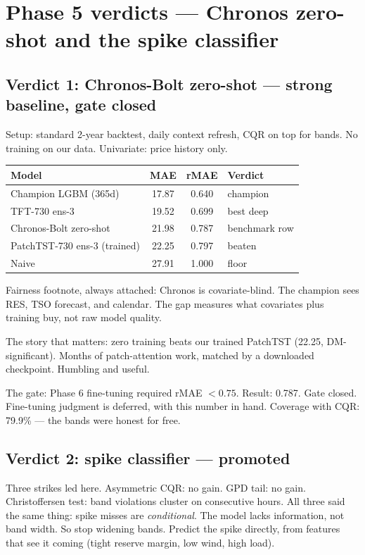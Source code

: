 \section{Phase 5 verdicts --- Chronos zero-shot and the spike classifier}

\subsection{Verdict 1: Chronos-Bolt zero-shot --- strong baseline, gate closed}

Setup: standard 2-year backtest, daily context refresh, CQR on top
for bands. No training on our data. Univariate: price history only.

\begin{tabular}{lccl}
\hline
Model & MAE & rMAE & Verdict \\
\hline
Champion LGBM (365d) & 17.87 & 0.640 & champion \\
TFT-730 ens-3 & 19.52 & 0.699 & best deep \\
Chronos-Bolt zero-shot & 21.98 & 0.787 & benchmark row \\
PatchTST-730 ens-3 (trained) & 22.25 & 0.797 & beaten \\
Naive & 27.91 & 1.000 & floor \\
\hline
\end{tabular}

\vspace{0.5em}
Fairness footnote, always attached: Chronos is covariate-blind.
The champion sees RES, TSO forecast, and calendar. The gap measures
what covariates plus training buy, not raw model quality.

The story that matters: zero training beats our trained PatchTST
(22.25, DM-significant). Months of patch-attention work, matched by
a downloaded checkpoint. Humbling and useful.

The gate: Phase 6 fine-tuning required rMAE $< 0.75$. Result: 0.787.
Gate closed. Fine-tuning judgment is deferred, with this number in
hand. Coverage with CQR: 79.9\% --- the bands were honest for free.

\subsection{Verdict 2: spike classifier --- promoted}

Three strikes led here. Asymmetric CQR: no gain. GPD tail: no gain.
Christoffersen test: band violations cluster on consecutive hours.
All three said the same thing: spike misses are \emph{conditional}.
The model lacks information, not band width. So stop widening bands.
Predict the spike directly, from features that see it coming
(tight reserve margin, low wind, high load).

